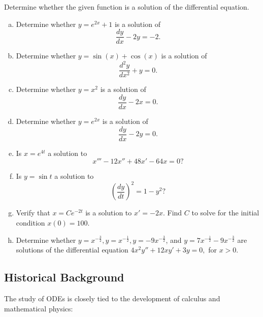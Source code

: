 \begin{question}
Determine whether the given function is a solution of the differential equation.

\begin{enumerate}[a)]
    \item Determine whether $y = e^{2x} + 1$ is a solution of 
    \[
    \frac{dy}{dx} - 2y = -2.
    \]
    
    \item Determine whether $y = \sin(x) + \cos(x)$ is a solution of 
    \[
    \frac{d^2y}{dx^2} + y = 0.
    \]
    
    \item Determine whether $y = x^2$ is a solution of 
    \[
    \frac{dy}{dx} - 2x = 0.
    \]

    \item Determine whether $y = e^{2x}$ is a solution of 
    \[
    \frac{dy}{dx} - 2y = 0.
    \]

    \item  Is \(x=e^{4t}\) a solution to \[x''' - 12x'' + 48x'-64x=0?\]

    \item Is \(y=\sin{t}\) a solution to
    \[
    \left(\frac{dy}{dt}\right)^2 = 1 - y^2?
    \]

    \item Verify that \(x=Ce^{-2t}\) is a solution to \(x' = - 2x\). Find \(C\) to solve for the initial condition \(x(0)=100.\)

    \item Determine whether \(y = x^{-\frac{3}{2}}, y=x^{-\frac{1}{2}}, y=-9x^{-\frac{3}{2}}\), and \(y=7x^{-\frac{1}{2}}-9x^{-\frac{3}{2}}\) are solutions of the differential equation
    \(4x^2y'' + 12xy' + 3y=0,
    \) for \(x>0\).
\end{enumerate}
\end{question}



\subsection{Historical Background}
The study of ODEs is closely tied to the development of calculus and mathematical physics:

